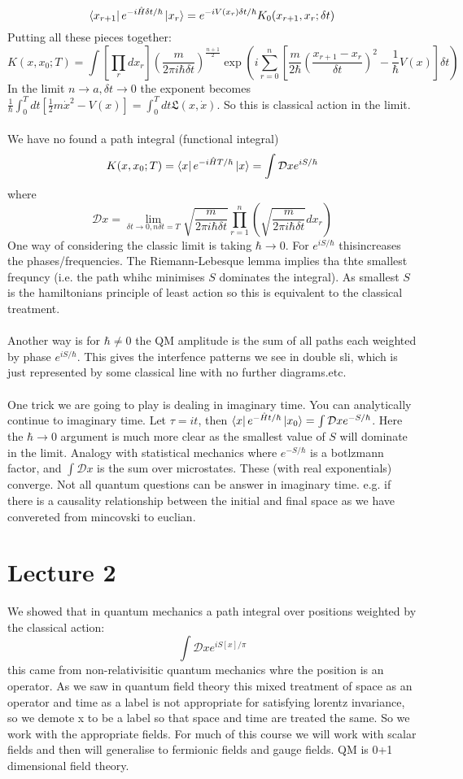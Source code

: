 \documentclass{article}
\begin{document}
$$
\bra{x_{r+1}} e^{-i \hat H \delta t/\hbar} \ket{x_r} = e^{-i V(x_r) \delta t/\hbar} K_0(x_{r+1}, x_r; \delta t)
$$
Putting all these pieces together:
\begin{equation}
        K(x,x_0;T) = \int [ \prod_r dx_r] (\frac{m}{2\pi i \hbar \delta t})^{\frac{n+1}{2}} \exp( i \sum_{r=0}^n [ \frac{m}{2\hbar}( \frac{x_{r+1} - x_r}{\delta t})^2  - \frac{1}{\hbar} V(x)] \delta t)
\end{equation}
In the limit $n\rightarrow a, \delta t \rightarrow 0$ the exponent becomes $\frac{1}{\hbar} \int_0^T dt [ \frac{1}{2} m \dot x^2 - V(x)] = \int_0^T dt \mathfrak{L}(x,\dot x)$. So this is classical action in the limit.\\\\
We have no found a path integral (functional integral)
$$
K(x, x_0; T) = \bra{x} e^{- i \hat H T /\hbar} \ket{x} = \int \mathcal{D}x e^{i S/\hbar}
$$
where $$\mathcal{D}x = \lim_{\delta t \rightarrow 0, n \delta t = T} \sqrt{\frac{m}{2 \pi i \hbar \delta t}} \prod_{r=1}^n ( \sqrt{\frac{m}{2 \pi i \hbar \delta t}} dx_r)$$
One way of considering the classic limit is taking $\hbar \rightarrow 0$. For $e^{iS/\hbar}$ thisincreases the phases/frequencies. The Riemann-Lebesque lemma implies tha thte smallest frequncy (i.e. the path whihc minimises $S$ dominates the integral). As smallest $S$ is the hamiltonians principle of least action so this is equivalent to the classical treatment. \\\\
Another way is for $\hbar \neq 0$ the QM amplitude is the sum of all paths each weighted by phase $e^{iS/\hbar}$. This gives the interfence patterns we see in double sli, which is just represented by some classical line with no further diagrams.etc.\\\\
One trick we are going to play is dealing in imaginary time. You can analytically continue to imaginary time. Let $\tau = it$, then $\bra{x} e^{- \hat H t/\hbar} \ket{x_0} = \int \mathcal{D}x e^{-S/\hbar}$. Here the $\hbar \rightarrow 0$ argument is much more clear as the smallest value of $S$ will dominate in the limit. Analogy with statistical mechanics where $e^{-S /\hbar}$ is a botlzmann factor, and $\int \mathcal{D}x $ is the sum over microstates. These (with real exponentials) converge. Not all quantum questions can be answer in imaginary time. e.g. if there is a causality relationship between the initial and final space as we have convereted from mincovski to euclian.
\section{Lecture 2}
We showed that in quantum mechanics a path integral over positions weighted by the classical action:
$$
\int \mathcal{D}x e^{i S[x]/ \pi}
$$
this came from non-relativisitic quantum mechanics whre the position is an operator. As we saw in quantum field theory this mixed treatment of space as an operator and time as a label is not appropriate for satisfying lorentz invariance, so we demote x to be a label so that space and time are treated the same. So we work with the appropriate fields. For much of this course we will work with scalar fields and then will generalise to fermionic fields and gauge fields. QM is 0+1 dimensional field theory.
\end{document}
